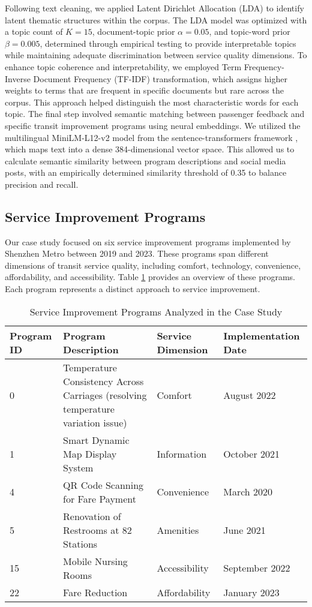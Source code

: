 \documentclass[a4paper,fleqn,12pt]{cas-sc}
\begin{document}
Following text cleaning, we applied Latent Dirichlet Allocation (LDA) to identify latent thematic structures within the corpus. The LDA model was optimized with a topic count of $K = 15$, document-topic prior $\alpha = 0.05$, and topic-word prior $\beta = 0.005$, determined through empirical testing to provide interpretable topics while maintaining adequate discrimination between service quality dimensions. To enhance topic coherence and interpretability, we employed Term Frequency-Inverse Document Frequency (TF-IDF) transformation, which assigns higher weights to terms that are frequent in specific documents but rare across the corpus. This approach helped distinguish the most characteristic words for each topic. The final step involved semantic matching between passenger feedback and specific transit improvement programs using neural embeddings. We utilized the multilingual MiniLM-L12-v2 model from the sentence-transformers framework \citep{reimers2019sentence}, which maps text into a dense 384-dimensional vector space. This allowed us to calculate semantic similarity between program descriptions and social media posts, with an empirically determined similarity threshold of 0.35 to balance precision and recall.

\subsection{Service Improvement Programs}

Our case study focused on six service improvement programs implemented by Shenzhen Metro between 2019 and 2023. These programs span different dimensions of transit service quality, including comfort, technology, convenience, affordability, and accessibility. Table \ref{tab:programs} provides an overview of these programs. Each program represents a distinct approach to service improvement.

\begin{table}[h]
\centering
\caption{Service Improvement Programs Analyzed in the Case Study}
\label{tab:programs}
\begin{tabular}{p{}p{}p{}p{}}
\hline
Program ID & Program Description & Service Dimension & Implementation Date \\
\hline
0 & Temperature Consistency Across Carriages (resolving temperature variation issue) & Comfort & August 2022 \\
1 & Smart Dynamic Map Display System & Information & October 2021 \\
4 & QR Code Scanning for Fare Payment & Convenience & March 2020 \\
5 & Renovation of Restrooms at 82 Stations & Amenities & June 2021 \\
15 & Mobile Nursing Rooms & Accessibility & September 2022 \\
22 & Fare Reduction & Affordability & January 2023 \\
\hline
\end{tabular}
\end{table}
\end{document}
